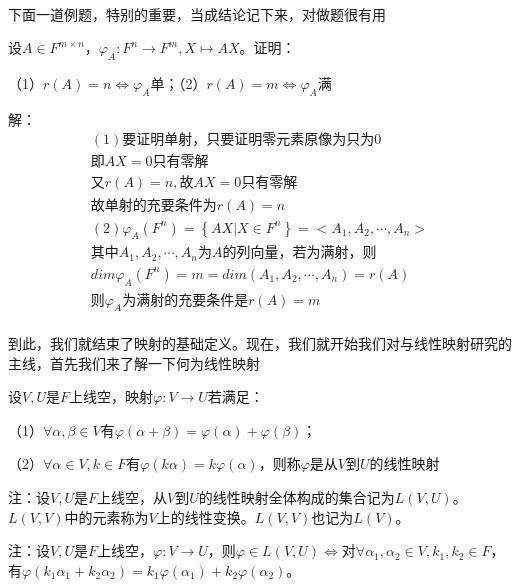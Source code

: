 \documentclass[lang=cn,10pt]{elegantbook}
\begin{document}
	~\\
	
	下面一道例题，特别的重要，当成结论记下来，对做题很有用
	
	\begin{example}
		设$A\in F^{m\times n}，\varphi_A:F^n\rightarrow F^m,X\mapsto AX$。证明：
		
		（1）$r(A)=n\Leftrightarrow\varphi_A$单；（2）$r(A)=m\Leftrightarrow\varphi_A$满
	\end{example}
	解：
	\begin{equation*}
		\begin{split}
			\left( 1 \right) \text{要证明单射，只要证明零元素原像为只为}0
			\\
			\text{即}AX=0\text{只有零解}
			\\
			\text{又}r\left( A \right) =n,\text{故}AX=0\text{只有零解}
			\\
			\text{故单射的充要条件为}r\left( A \right) =n
			\\
			\left( 2 \right) \varphi _A\left( F^n \right) =\left\{ AX|X\in F^n \right\} =<A_1,A_2,\cdots ,A_n>
			\\
			\text{其中}A_1,A_2,\cdots ,A_n\text{为}A\text{的列向量，若为满射，则}
			\\
			dim\varphi _A\left( F^n \right) =m=dim\left( A_1,A_2,\cdots ,A_n \right) =r\left( A \right) 
			\\
			\text{则}\varphi _A\text{为满射的充要条件是}r\left( A \right) =m
		\end{split}
	\end{equation*}
	~\\
	到此，我们就结束了映射的基础定义。现在，我们就开始我们对与线性映射研究的主线，首先我们来了解一下何为线性映射
	\begin{definition}[线性映射]
		设$V,U$是$F$上线空，映射$\varphi:V\rightarrow U$若满足：
		
		（1）$\forall\alpha,\beta\in V$有$\varphi(\alpha+\beta)=\varphi(\alpha)+\varphi(\beta)$；
		
		（2）$\forall\alpha\in V,k\in F$有$\varphi(k\alpha)=k\varphi(\alpha)$，则称$\varphi$是从$V$到$U$的线性映射
	\end{definition}
	注：设$V,U$是$F$上线空，从$V$到$U$的线性映射全体构成的集合记为$L(V,U)$。$L(V,V)$中的元素称为$V$上的线性变换。$L(V,V)$也记为$L(V)$。
	
	注：设$V,U$是$F$上线空，$\varphi:V\rightarrow U$，则$\varphi\in L(V,U)\Leftrightarrow$对$\forall\alpha_1,\alpha_2\in V,k_1,k_2\in F$，有$\varphi(k_1\alpha_1+k_2\alpha_2)=k_1\varphi(\alpha_1)+k_2\varphi(\alpha_2)$。
	
\end{document}
